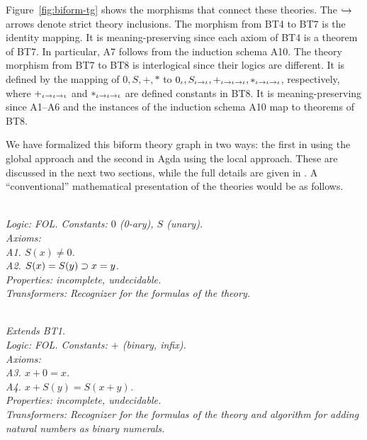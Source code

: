 \documentclass[fleqn]{llncs}
\newcommand{\appendicesref}[2]
  {\iftoggle{cicm}
    {appendices #1 and #2 of \cite{CaretteFarmerArxiv17}}
    {appendices #1 and #2}%
  }
\begin{document}
Figure~\ref{fig:biform-tg} shows the morphisms that connect these
theories.  The $\hookrightarrow$ arrows denote strict theory inclusions.
The morphism from BT4 to BT7 is the identity mapping.  It is
meaning-preserving since each axiom of BT4 is a theorem of BT7.  In
particular, A7 follows from the induction schema A10.  The theory
morphism from BT7 to BT8 is interlogical since their logics are
different.  It is defined by the mapping of $0, S, +, *$ to $0_\iota,
S_{\iota \rightarrow \iota}, +_{\iota \rightarrow \iota \rightarrow \iota},
*_{\iota \rightarrow \iota \rightarrow \iota}$, respectively, where $+_{\iota
  \rightarrow \iota \rightarrow \iota}$ and $*_{\iota \rightarrow \iota \rightarrow
  \iota}$ are defined constants in BT8. It is meaning-preserving since
A1--A6 and the instances of the induction schema A10 map to theorems
of BT8.

We have formalized this biform theory graph in two ways: the first in
{\churchuqe} using the global approach and the second in Agda using
the local approach.  These are discussed in the next
two sections, while the full details are given in \appendicesref{A}{B}.
A ``conventional'' mathematical presentation of the theories would be
as follows.

\begin{biformthy}\em\ \\
\emph{Logic}: FOL. \emph{Constants}: $0$ (0-ary), $S$ (unary).\\
\emph{Axioms}:\\
\indent A1. $S(x) \not= 0$.\\
\indent A2. $S(x) = S(y) \supset x = y$.\\
\emph{Properties}: incomplete, undecidable.\\
\emph{Transformers}: Recognizer for the formulas of the theory.
\end{biformthy}

\begin{biformthy}\em\ \\
Extends BT1.\\
\emph{Logic}: FOL. \emph{Constants}: $+$ (binary, infix).\\
\emph{Axioms}:\\
\indent A3. $x + 0 = x$.\\
\indent A4. $x + S(y) = S(x + y)$.\\
\emph{Properties}: incomplete, undecidable.\\
\emph{Transformers}: Recognizer for the formulas of the theory and  
algorithm for adding natural numbers as binary numerals.
\end{biformthy}
\end{document}
